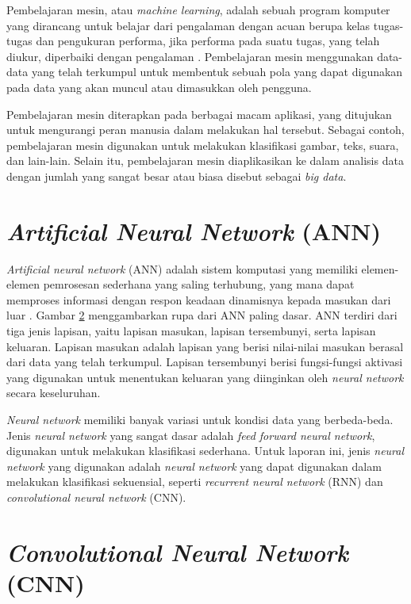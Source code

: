 Pembelajaran mesin, atau \textit{machine learning}, adalah sebuah program komputer yang dirancang untuk belajar dari pengalaman dengan acuan berupa kelas tugas-tugas dan pengukuran performa, jika performa pada suatu tugas, yang telah diukur, diperbaiki dengan pengalaman \parencite{mitchell1997machine}. Pembelajaran mesin menggunakan data-data yang telah terkumpul untuk membentuk sebuah pola yang dapat digunakan pada data yang akan muncul atau dimasukkan oleh pengguna.

Pembelajaran mesin diterapkan pada berbagai macam aplikasi, yang ditujukan untuk mengurangi peran manusia dalam melakukan hal tersebut. Sebagai contoh, pembelajaran mesin digunakan untuk melakukan klasifikasi gambar, teks, suara, dan lain-lain. Selain itu, pembelajaran mesin diaplikasikan ke dalam analisis data dengan jumlah yang sangat besar atau biasa disebut sebagai \textit{big data}.

\section{\textit{Artificial Neural Network} (ANN)}

\textit{Artificial neural network} (ANN) adalah sistem komputasi yang memiliki elemen-elemen pemrosesan sederhana yang saling terhubung, yang mana dapat memproses informasi dengan respon keadaan dinamisnya kepada masukan dari luar \parencite{caudill1987neural}. Gambar \ref{} menggambarkan rupa dari ANN paling dasar. ANN terdiri dari tiga jenis lapisan, yaitu lapisan masukan, lapisan tersembunyi, serta lapisan keluaran. Lapisan masukan adalah lapisan yang berisi nilai-nilai masukan berasal dari data yang telah terkumpul. Lapisan tersembunyi berisi fungsi-fungsi aktivasi yang digunakan untuk menentukan keluaran yang diinginkan oleh \textit{neural network} secara keseluruhan.

\textit{Neural network} memiliki banyak variasi untuk kondisi data yang berbeda-beda. Jenis \textit{neural network} yang sangat dasar adalah \textit{feed forward neural network}, digunakan untuk melakukan klasifikasi sederhana. Untuk laporan ini, jenis \textit{neural network} yang digunakan adalah \textit{neural network} yang dapat digunakan dalam melakukan klasifikasi sekuensial, seperti \textit{recurrent neural network} (RNN) dan \textit{convolutional neural network} (CNN).

\section{\textit{Convolutional Neural Network} (CNN)}

